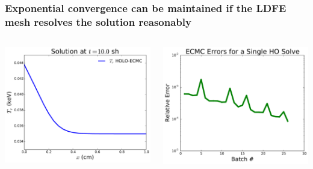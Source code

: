 \documentclass[xcolor=dvipsnames,hyperref={pdfpagelabels=false},unknownkeysallowed]{beamer}
\begin{document}
\begin{frame}
    \frametitle{Exponential convergence can be maintained if the LDFE mesh resolves the solution reasonably}
    \begin{columns}
    \begin{column}{0.5\textwidth}
        \vspace{0pt}
  \centering
    \includegraphics[width=\linewidth]{heated_marshak_new.pdf}
    \end{column}
    \begin{column}{0.5\textwidth}
        \vspace{0pt}
        \centering
        \includegraphics[width=\linewidth]{errors.pdf}
    \end{column}
\end{columns}
\end{frame}
\end{document}
